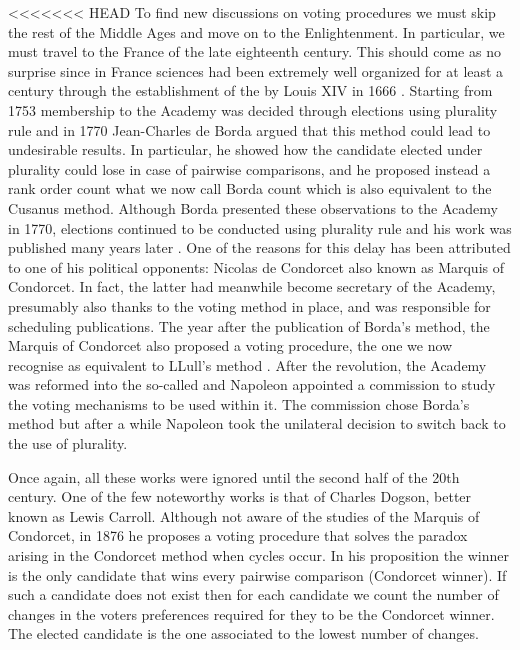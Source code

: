 <<<<<<< HEAD
To find new discussions on voting procedures we must skip the rest of the Middle Ages and move on to the Enlightenment. In particular, we must travel to the France of the late eighteenth century. This should come as no surprise since in France sciences had been extremely well organized for at least a century through the establishment of the  by Louis XIV in 1666 \citep{Demeulenaere1995}. Starting from 1753 membership to the Academy was decided through elections using plurality rule and in 1770 Jean-Charles de Borda argued that this method could lead to undesirable results. In particular, he showed how the candidate elected under plurality could lose in case of pairwise comparisons, and he proposed instead a rank order count \textemdash what we now call Borda count which is also equivalent to the Cusanus method. Although Borda presented these observations to the Academy in 1770, elections continued to be conducted using plurality rule and his work was published many years later \citep{Borda1784}. 
One of the reasons for this delay has been attributed to one of his political opponents: Nicolas de Condorcet \citep{Urken2004} \textemdash also known as Marquis of Condorcet. In fact, the latter had meanwhile become secretary of the Academy, presumably also thanks to the voting method in place, and was responsible for scheduling publications. %
The year after the publication of Borda's method, the Marquis of Condorcet also proposed a voting procedure, the one we now recognise as equivalent to LLull's method \citep{Condorcet1785}.
After the revolution, the Academy was reformed into the so-called  and Napoleon appointed a commission to study the voting mechanisms to be used within it. The commission chose Borda's method but after a while Napoleon took the unilateral decision to switch back to the use of plurality.

Once again, all these works were ignored until the second half of the 20th century. One of the few noteworthy works is that of Charles Dogson, better known as Lewis Carroll. Although not aware of the studies of the Marquis of Condorcet, in 1876 he proposes a voting procedure that solves the paradox arising in the Condorcet method when cycles occur.
In his proposition the winner is the only candidate that wins every pairwise comparison (Condorcet winner). If such a candidate does not exist then for each candidate we count the number of changes in the voters preferences required for they to be the Condorcet winner. The elected candidate is the one associated to the lowest number of changes.

